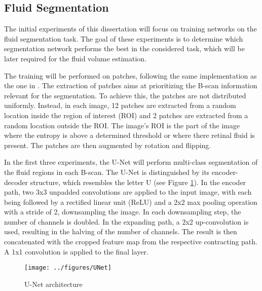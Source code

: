 \subsection{Fluid Segmentation}
The initial experiments of this dissertation will focus on training networks on the fluid segmentation task. The goal of these experiments is to determine which segmentation network performs the best in the considered task, which will be later required for the fluid volume estimation.
\par
The training will be performed on patches, following the same implementation as the one in \textcite{Tennakoon2018}. The extraction of patches aims at prioritizing the B-scan information relevant for the segmentation. To achieve this, the patches are not distributed uniformly. Instead, in each image, 12 patches are extracted from a random location inside the region of interest (ROI) and 2 patches are extracted from a random location outside the ROI. The image's ROI is the part of the image where the entropy is above a determined threshold or where there retinal fluid is present. The patches are then augmented by rotation and flipping.
\par
In the first three experiments, the U-Net \parencite{Ronneberger2015} will perform multi-class segmentation of the fluid regions in each B-scan. The U-Net is distinguished by its encoder-decoder structure, which resembles the letter U (see Figure \ref{fig:UNet}). In the encoder path, two 3x3 unpadded convolutions are applied to the input image, with each being followed by a rectified linear unit (ReLU) and a 2x2 max pooling operation with a stride of 2, downsampling the image. In each downsampling step, the number of channels is doubled. In the expanding path, a 2x2 up-convolution is used, resulting in the halving of the number of channels. The result is then concatenated with the cropped feature map from the respective contracting path. A 1x1 convolution is applied to the final layer.

\begin{figure}[!ht]
	\centering
	\texttt{[image: ../figures/UNet]}
	\caption{U-Net architecture \cite{Ronneberger2015}}
	\label{fig:UNet}
\end{figure}

